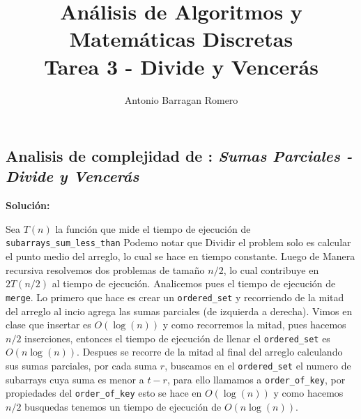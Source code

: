\documentclass[12pt]{article}
\title{Análisis de Algoritmos y Matemáticas Discretas \\
    Tarea 3 - Divide y Vencerás }
\author{Antonio Barragan Romero}
\begin{document}
\maketitle
    \subsection*{Analisis de complejidad de : \emph{Sumas Parciales - Divide y Vencerás}}

    \textbf{Solución:}

    Sea $T(n)$ la función que mide el tiempo de ejecución de \verb|subarrays_sum_less_than|
    Podemo notar que Dividir el problem solo es calcular el punto medio del arreglo, lo cual se 
    hace en tiempo constante.
    Luego de Manera recursiva resolvemos dos problemas de tamaño $n/2$, lo cual contribuye en 
    $2T(n/2)$ al tiempo de ejecución.
    Analicemos pues el tiempo de ejecución de \verb|merge|.
    Lo primero que hace es crear un \verb|ordered_set| y recorriendo de la mitad del arreglo al incio agrega
    las sumas parciales (de izquierda a derecha).
    Vimos en clase que insertar es $O(\log(n))$ y como recorremos la mitad, pues hacemos $n/2$ inserciones, 
    entonces el tiempo de ejecución de llenar el \verb|ordered_set| es $O(n\log(n))$.
    Despues se recorre de la mitad al final del arreglo calculando sus sumas parciales, por cada suma $r$, 
    buscamos en el \verb|ordered_set| el numero de subarrays cuya suma es menor a $t-r$, para ello 
    llamamos a \verb|order_of_key|, por propiedades del \verb|order_of_key| esto se hace en $O(\log(n))$ 
    y como hacemos $n/2$ busquedas tenemos un tiempo de ejecución de $O(n\log(n))$.
\end{document}
